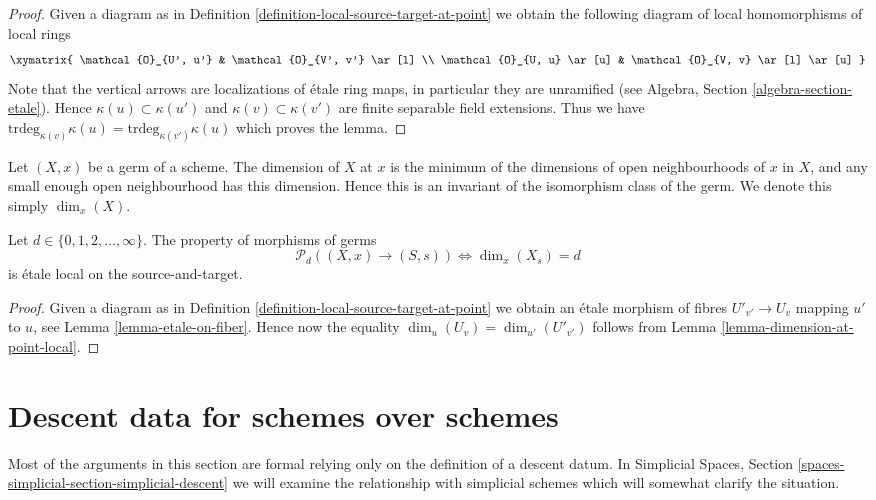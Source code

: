 \begin{proof}
Given a diagram as in
Definition \ref{definition-local-source-target-at-point}
we obtain the following diagram of local homomorphisms of local rings
$$
\xymatrix{
\mathcal{O}_{U', u'} & \mathcal{O}_{V', v'} \ar[l] \\
\mathcal{O}_{U, u} \ar[u] & \mathcal{O}_{V, v} \ar[l] \ar[u]
}
$$
Note that the vertical arrows are localizations of \'etale ring maps,
in particular they are unramified (see
Algebra, Section \ref{algebra-section-etale}).
Hence $\kappa(u) \subset \kappa(u')$ and $\kappa(v) \subset \kappa(v')$
are finite separable field extensions.
Thus we have
$\text{trdeg}_{\kappa(v)} \kappa(u) = \text{trdeg}_{\kappa(v')} \kappa(u)$
which proves the lemma.
\end{proof}

\noindent
Let $(X, x)$ be a germ of a scheme.
The dimension of $X$ at $x$ is the minimum of the dimensions of
open neighbourhoods of $x$ in $X$, and any small enough open neighbourhood
has this dimension. Hence this is an invariant of the isomorphism class
of the germ. We denote this simply $\dim_x(X)$.

\begin{lemma}
\label{lemma-dimension-at-point}
Let $d \in \{0, 1, 2, \ldots, \infty\}$.
The property of morphisms of germs
$$
\mathcal{P}_d((X, x) \to (S, s))
\Leftrightarrow
\dim_x (X_s) = d
$$
is \'etale local on the source-and-target.
\end{lemma}

\begin{proof}
Given a diagram as in
Definition \ref{definition-local-source-target-at-point}
we obtain an \'etale morphism of fibres
$U'_{v'} \to U_v$ mapping $u'$ to $u$, see
Lemma \ref{lemma-etale-on-fiber}.
Hence now the equality $\dim_u(U_v) = \dim_{u'}(U'_{v'})$ follows from
Lemma \ref{lemma-dimension-at-point-local}.
\end{proof}







\section{Descent data for schemes over schemes}
\label{section-descent-datum}

\noindent
Most of the arguments in this section are formal relying only
on the definition of a descent datum. In
Simplicial Spaces, Section \ref{spaces-simplicial-section-simplicial-descent}
we will examine the relationship with simplicial schemes which will
somewhat clarify the situation.

